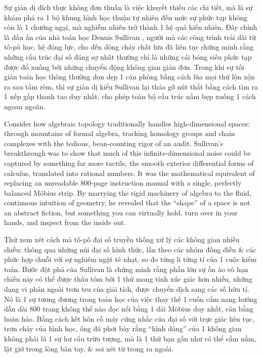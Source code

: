 \documentclass[11pt]{article}
\begin{document}
Sự giản dị đích thực không đơn thuần là việc khuyết thiếu các chi tiết, mà là sự khám phá ra 1 bộ khung hình học thuận tự nhiên đến mức sự phức tạp không còn là 1 chướng ngại, mà nghiễm nhiên trở thành 1 hệ quả hiển nhiên. Đây chính là dấu ấn của nhà toán học Dennis Sullivan \cite{Sullivan2017}, người mà các công trình trải dài từ tô-pô học, hệ động lực, cho đến dòng chảy chất lưu đã liên tục chứng minh rằng những cấu trúc đại số đáng sợ nhất thường chỉ là những cái bóng siêu phức tạp được đổ xuống bởi những chuyển động không gian giản đơn. Trong khi sự tối giản toán học thông thường dọn dẹp 1 căn phòng bằng cách lùa mọi thứ lộn xộn ra sau tấm rèm, thì sự giản dị kiểu Sullivan lại tháo gỡ nút thắt bằng cách tìm ra 1 nếp gấp thanh tao duy nhất, cho phép toàn bộ cấu trúc nằm bẹp xuống 1 cách ngoan ngoãn.

Consider how algebraic topology traditionally handles high-dimensional spaces: through mountains of formal algebra, tracking homology groups and chain complexes with the tedious, bean-counting rigor of an audit. Sullivan's breakthrough was to show that much of this infinite-dimensional noise could be captured by something far more tactile, the smooth exterior differential forms of calculus, translated into rational numbers. It was the mathematical equivalent of replacing an unreadable 800-page instruction manual with a single, perfectly balanced M\"obius strip. By marrying the rigid machinery of algebra to the fluid, continuous intuition of geometry, he revealed that the ``shape'' of a space is not an abstract fiction, but something you can virtually hold, turn over in your hands, and inspect from the inside out.

Thử xem xét cách mà tô-pô đại số truyền thống xử lý các không gian nhiều chiều: thông qua những núi đại số hình thức, lần theo các nhóm đồng điều \& các phức hợp chuỗi với sự nghiêm ngặt tẻ nhạt, so đo từng li từng tí của 1 cuộc kiểm toán. Bước đột phá của Sullivan là chứng minh rằng phần lớn sự ồn ào vô hạn chiều này có thể được thâu tóm bởi 1 thứ mang tính xúc giác hơn nhiều, những dạng vi phân ngoài trơn tru của giải tích, được chuyển dịch sang các số hữu tỉ. Nó là 1 sự tương đương trong toán học của việc thay thế 1 cuốn cẩm nang hướng dẫn dài 800 trang không thể nào đọc nổi bằng 1 dải M\"obius duy nhất, cân bằng hoàn hảo. Bằng cách kết hôn cỗ máy cứng nhắc của đại số với trực giác liên tục, trơn chảy của hình học, ông đã phơi bày rằng ``hình dáng'' của 1 không gian không phải là 1 sự hư cấu trừu tượng, mà là 1 thứ bạn gần như có thể cầm nắm, lật giở trong lòng bàn tay, \& soi xét từ trong ra ngoài.
\end{document}
